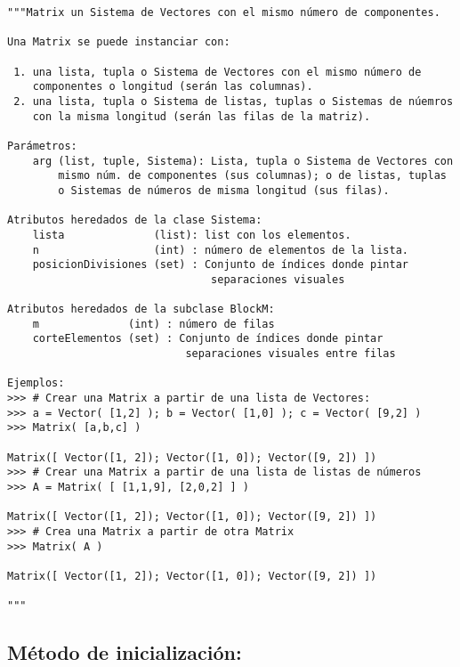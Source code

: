 \documentclass[11pt]{report}
\begin{document}
\begin{verbatim}
"""Matrix un Sistema de Vectores con el mismo número de componentes.

Una Matrix se puede instanciar con:

 1. una lista, tupla o Sistema de Vectores con el mismo número de
    componentes o longitud (serán las columnas).
 2. una lista, tupla o Sistema de listas, tuplas o Sistemas de núemros
    con la misma longitud (serán las filas de la matriz).

Parámetros:
    arg (list, tuple, Sistema): Lista, tupla o Sistema de Vectores con
        mismo núm. de componentes (sus columnas); o de listas, tuplas
        o Sistemas de números de misma longitud (sus filas).

Atributos heredados de la clase Sistema:
    lista              (list): list con los elementos.
    n                  (int) : número de elementos de la lista.
    posicionDivisiones (set) : Conjunto de índices donde pintar
                                separaciones visuales

Atributos heredados de la subclase BlockM:
    m              (int) : número de filas
    corteElementos (set) : Conjunto de índices donde pintar
                            separaciones visuales entre filas

Ejemplos:
>>> # Crear una Matrix a partir de una lista de Vectores:
>>> a = Vector( [1,2] ); b = Vector( [1,0] ); c = Vector( [9,2] )
>>> Matrix( [a,b,c] )

Matrix([ Vector([1, 2]); Vector([1, 0]); Vector([9, 2]) ])
>>> # Crear una Matrix a partir de una lista de listas de números
>>> A = Matrix( [ [1,1,9], [2,0,2] ] )

Matrix([ Vector([1, 2]); Vector([1, 0]); Vector([9, 2]) ])
>>> # Crea una Matrix a partir de otra Matrix
>>> Matrix( A )

Matrix([ Vector([1, 2]); Vector([1, 0]); Vector([9, 2]) ])

"""
\end{verbatim}

\subsection{Método de inicialización:}
\label{sec:org85b835f}
\end{document}
